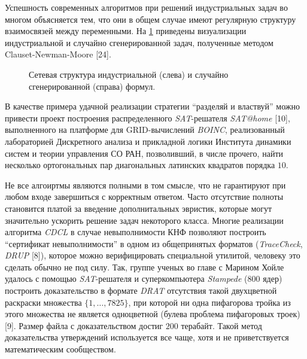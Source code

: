 Успешность современных алгоритмов при решений индустриальных задач во многом объясняется тем, что они в общем случае имеют регулярную структуру взаимосвязей между переменными. На \figurename{ \ref{chapter1:fig:satgraph}} приведены визуализации индустриальной и случайно сгенерированной задач, полученные методом Clauset-Newman-Moore [24].

\begin{figure}[h]
\centering
\captionsetup{justification=centering}
\caption{Сетевая структура индустриальной (слева) и случайно сгенерированной (справа) формул.}
\label{chapter1:fig:satgraph}
\end{figure}

В качестве примера удачной реализации стратегии \enquote{разделяй и властвуй} можно привести проект построения распределенного \textit{SAT}-решателя \textit{SAT@home} [10], выполненного на платформе для GRID-вычислений \textit{BOINC}, реализованный лабораторией Дискретного анализа и прикладной логики Института динамики систем и теории управления СО РАН, позволивший, в числе прочего, найти несколько ортогональных пар диагональных латинских квадратов порядка $10$.

Не все алгоиртмы являются полными в том смысле, что не гарантируют при любом входе завершиться с корректным ответом. Часто отсутствие полноты становится платой за введение дополнитальных эвристик, которые могут значительно ускорить решение задач некоторого класса. 
Многие реализации алгоритма \textit{CDCL} в случае невыполнимости КНФ позволяют построить \enquote{сертификат невыполнимости} в одном из общепринятых форматов (\textit{TraceCheck}, \textit{DRUP} [8]), которое можно верифицировать специальной утилитой, человеку это сделать обычно не под силу. 
Так, группе ученых во главе с Марином Хойле удалось с помощью \textit{SAT}-решателя и суперкомпьютера \textit{Stampede} ($800$ ядер) построить доказательство в формате \textit{DRAT} отсутствия такой двухцветной раскраски множества $\{1, \dots, 7825\}$, при которой ни одна пифагорова тройка из этого множества не является одноцветной (булева проблема пифагоровых троек) [9]. Размер файла с доказательством достиг $200$ терабайт. Такой метод доказательства утверждений используется все чаще, хотя и не приветствуется математическим сообществом.

